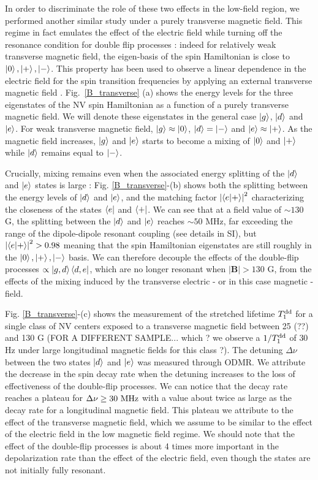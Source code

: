 \documentclass[preprintnumbers,amsmath,amssymb,superscriptaddress,twocolumn,showpacs]{revtex4-2}
\begin{document}
In order to discriminate the role of these two effects in the low-field region, we performed another similar study under a purely transverse magnetic field.
This regime in fact emulates the effect of the electric field while turning off the resonance condition for double flip processes : indeed for relatively weak transverse magnetic field, the eigen-basis of the spin Hamiltonian is close to $\ket{0},\ket{+},\ket{-}$. This property has been used to observe a linear dependence in the electric field for the spin transition frequencies by applying an external transverse magnetic field \cite{dolde2011electric,qiu2022nanoscale}.
Fig.~\ref{B_transverse} (a) shows the energy levels for the three eigenstates of the NV spin Hamiltonian as a function of a purely transverse magnetic field. We will denote these eigenstates in the general case $\ket{g}$, $\ket{d}$ and $\ket{e}$. For weak transverse magnetic field, $\ket{g} \approx \ket{0}$, $\ket{d}=\ket{-}$ and $\ket{e} \approx \ket{+}$. As the magnetic field increases, $\ket{g}$ and $\ket{e}$ starts to become a mixing of $\ket{0}$ and $\ket{+}$ while $\ket{d}$ remains equal to $\ket{-}$.

Crucially, mixing remains even when the associated energy splitting of the $\ket{d}$ and $\ket{e}$ states is large : Fig. \ref{B_transverse}-(b) shows both the splitting between the energy levels of $\ket{d}$ and $\ket{e}$, and the matching factor $\abs{\bra{e}\ket{+}}^2$ characterizing the closeness of the states $\bra{e}$ and $\bra{+}$. We can see that at a field value of $\sim 130$ G, the splitting between the $\ket{d}$ and $\ket{e}$ reaches $\sim 50$ MHz, far exceeding the range of the dipole-dipole resonant coupling (see details in SI), but $\abs{\bra{e}\ket{+}}^2 > 0.98$ meaning that the spin Hamiltonian eigenstates are still roughly in the $\ket{0}, \ket{+}, \ket{-}$ basis. We can therefore decouple the effects of the double-flip processes  $\propto \ket{g,d}\bra{d,e}$, which are no longer resonant when $| \bm B | > 130$ G, from the effects of the mixing induced by the transverse electric - or in this case magnetic - field.

Fig. \ref{B_transverse}-(c) shows the measurement of the stretched lifetime $T_1^{\rm dd}$ for a single class of NV centers exposed to a transverse magnetic field between 25 (??) and 130 G (FOR A DIFFERENT SAMPLE... which ? we observe a $1/T_1^{\rm dd}$ of $30$ Hz under large longitudinal magnetic fields for this class ?). The detuning $\Delta \nu$ between the two states $\ket{d}$ and $\ket{e}$ was measured through ODMR. We attribute the decrease in the spin decay rate when the detuning increases to the loss of effectiveness of the double-flip processes. We can notice that the decay rate reaches a plateau for $\Delta \nu \geq 30\ \rm MHz$ with a value about twice as large as the decay rate for a longitudinal magnetic field. This plateau we attribute to the effect of the transverse magnetic field, which we assume to be similar to the effect of the electric field in the low magnetic field regime. We should note that the effect of the double-flip processes is about 4 times more important in the depolarization rate than the effect of the electric field, even though the states are not initially fully resonant.
\end{document}
